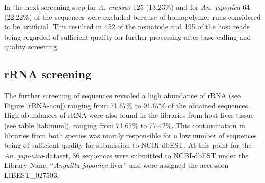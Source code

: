 In the next screening-step for \textit{A. crassus} 125 (13.23\%) and
for \textit{An. japonica} 64 (22.22\%) of the sequences were
excluded because of homopolymer-runs considered to be artificial. This
resulted in 452 of the nematode and 195 of the host reads being
regarded of sufficient quality for further processing after
base-calling and quality screening.

\subsection{rRNA screening}
\label{rRNA-pil}

The further screening of sequences revealed a high abundance of rRNA
(see Figure \ref{rRNA-con}) ranging from 71.67\% to 91.67\% of the
obtained sequences.  High abundances of rRNA were also found in the
libraries from host liver tissue (see table \ref{tab:num}), ranging
from 71.67\% to 77.42\%. This contamination in libraries from both
species was mainly responsible for a low number of sequences being of
sufficient quality for submission to NCBI-dbEST. At this point for the
\textit{An. japonica}-dataset, 36 sequences were submitted to
NCBI-dbEST under the Library Name ``\textit{Anguilla japonica} liver''
and were assigned the accession LIBEST\_027503.


